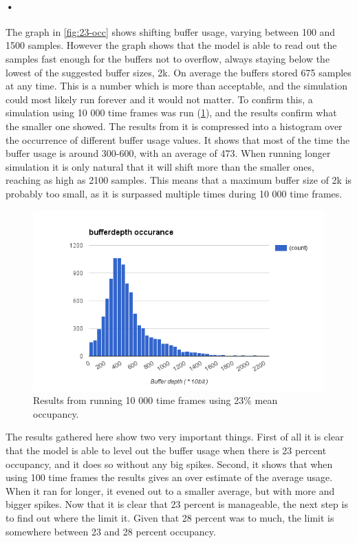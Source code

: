 \documentclass[a4paper, 12pt]{report}
\begin{document}
\paragraph{•}
The graph in \ref{fig:23-occ} shows shifting buffer usage, varying between 100 and 1500 samples.
However the graph shows that the model is able to read out the samples fast enough for the buffers not to overflow, always staying below the lowest of the suggested buffer sizes, 2k.
On average the buffers stored 675 samples at any time.
This is a number which is more than acceptable, and the simulation could most likely run forever and it would not matter.
To confirm this, a simulation using 10 000 time frames was run (\ref{fig:10k-23-occ}), and the results confirm what the smaller one showed.
The results from it is compressed into a histogram over the occurrence of different buffer usage values.
It shows that most of the time the buffer usage is around 300-600, with an average of 473.
When running longer simulation it is only natural that it will shift more than the smaller ones, reaching as high as 2100 samples.
This means that a maximum buffer size of 2k is probably too small, as it is surpassed multiple times during 10 000 time frames.

\begin{figure}[h!]
	\centering
		\includegraphics[width=1.0\textwidth]{images/10k-23-occ.png}
		\caption{Results from running 10 000 time frames using 23\% mean occupancy.}
		\label{fig:10k-23-occ}
\end{figure}

The results gathered here show two very important things.
First of all it is clear that the model is able to level out the buffer usage when there is 23 percent occupancy, and it does so without any big spikes.
Second, it shows that when using 100 time frames the results gives an over estimate of the average usage.
When it ran for longer, it evened out to a smaller average, but with more and bigger spikes.
Now that it is clear that 23 percent is manageable, the next step is to find out where the limit it.
Given that 28 percent was to much, the limit is somewhere between 23 and 28 percent occupancy.
\end{document}
